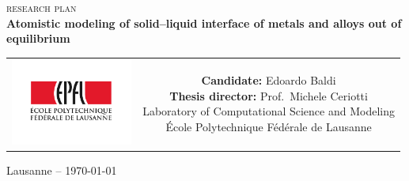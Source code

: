 \begin{titlepage}
\begin{center}

\begingroup
\sffamily
\null\vspace{2cm}
{\Huge\scshape research plan} \\[12pt]
{\huge\bfseries Atomistic modeling of solid--liquid interface of metals and alloys out of equilibrium \\[24pt]} 
    
\vspace{4cm}
\begin{tabular}{cc}
\parbox{0.3\textwidth}{\includegraphics[angle=-90,width=4cm]{Images/epfl}}
&
\parbox{0.7\textwidth}{%
%
    {\bfseries Candidate:} Edoardo Baldi\\
    {\bfseries Thesis director:} Prof.~Michele Ceriotti\\[6pt]
%
    Laboratory of Computational Science and Modeling\\
	École Polytechnique Fédérale de Lausanne\\[6pt]
%
%
}
\end{tabular}
\vfill
{Lausanne -- \today}
\endgroup
\end{center}
\end{titlepage}